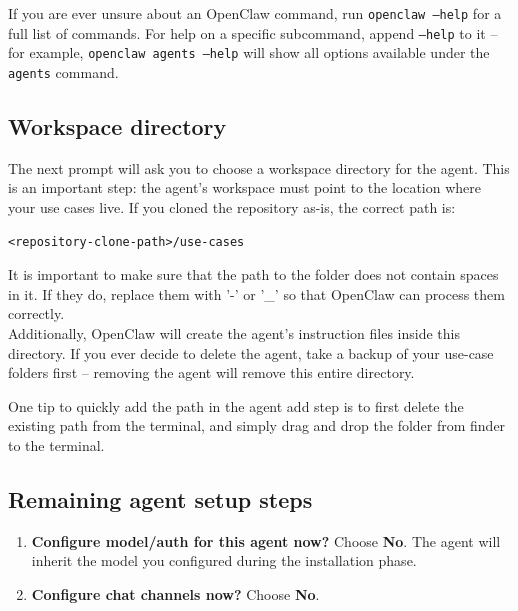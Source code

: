 \documentclass[12pt, a4paper]{article}
\begin{document}
\begin{notebox}
If you are ever unsure about an OpenClaw command, run \texttt{openclaw --help} for a full list of commands. For help on a specific subcommand, append \texttt{--help} to it -- for example, \texttt{openclaw agents --help} will show all options available under the \texttt{agents} command.
\end{notebox}

\subsection{Workspace directory}

The next prompt will ask you to choose a workspace directory for the agent. This is an important step: the agent's workspace must point to the location where your use cases live. If you cloned the repository as-is, the correct path is:

\begin{lstlisting}[style=plainstyle]
<repository-clone-path>/use-cases
\end{lstlisting}

\begin{warnbox}
It is important to make sure that the path to the folder does not contain spaces in it. If they do, replace them with '-' or '\_' so that OpenClaw can process them correctly.\\
Additionally, OpenClaw will create the agent's instruction files inside this directory. If you ever decide to delete the agent, take a backup of your use-case folders first -- removing the agent will remove this entire directory.
\end{warnbox}

\begin{notebox}
One tip to quickly add the path in the agent add step is to first delete the existing path from the terminal, and simply drag and drop the folder from finder to the terminal.
\end{notebox}

\subsection{Remaining agent setup steps}

\begin{enumerate}[leftmargin=1.5em]
\item \textbf{Configure model/auth for this agent now?} Choose \textbf{No}. The agent will inherit the model you configured during the installation phase.
\item \textbf{Configure chat channels now?} Choose \textbf{No}. 
\end{enumerate}
\end{document}
